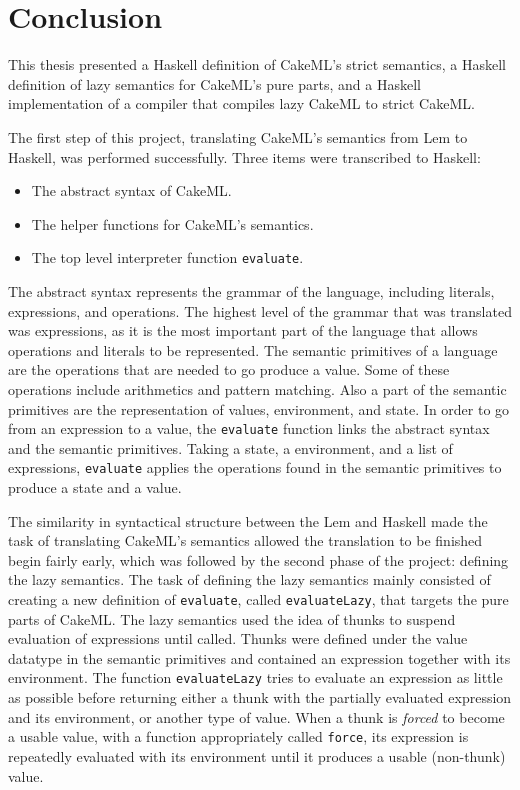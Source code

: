 \chapter{Conclusion}
This thesis presented a Haskell definition of CakeML's strict semantics,
a Haskell definition of lazy semantics for CakeML's pure parts, and a Haskell
implementation of a compiler that compiles lazy CakeML to strict CakeML.

The first step of this project, translating CakeML's semantics from Lem to
Haskell, was performed successfully. Three items were transcribed to Haskell:

\begin{itemize}
\item The abstract syntax of CakeML.
\item The helper functions for CakeML's semantics.
\item The top level interpreter function \texttt{evaluate}.
\end{itemize}
The abstract syntax represents the grammar of the language, including literals,
expressions, and operations. The highest level of the grammar that was
translated was expressions, as it is the most important part of the language
that allows operations and literals to be represented.
The semantic primitives of a language are the operations that are needed
to go produce a value. Some of these operations include arithmetics and
pattern matching. Also a part of the semantic primitives are the representation
of values, environment, and state.
In order to go from an expression to a value, the \texttt{evaluate} function
links the abstract syntax and the semantic primitives. Taking a state,
a environment, and a list of expressions, \texttt{evaluate} applies the
operations found in the semantic primitives to produce a state and a value.

The similarity in syntactical structure between the Lem and Haskell made the
task of translating CakeML's semantics allowed the translation to be finished
begin fairly early, which was followed by the second phase of the project:
defining the lazy semantics. The task of defining the lazy semantics mainly
consisted of creating a new definition of \texttt{evaluate}, called
\texttt{evaluateLazy}, that targets the pure parts of CakeML.
The lazy semantics used the idea of thunks to suspend
evaluation of expressions until called. Thunks were defined under the value
datatype in the semantic primitives and contained an expression together with
its environment. The function \texttt{evaluateLazy} tries to evaluate an
expression as little as possible before returning either a thunk with the
partially evaluated expression and its environment, or another type of value.
When a thunk is \textit{forced} to become a usable value, with a function
appropriately called \texttt{force}, its expression is repeatedly evaluated with
its environment until it produces a usable (non-thunk) value.

